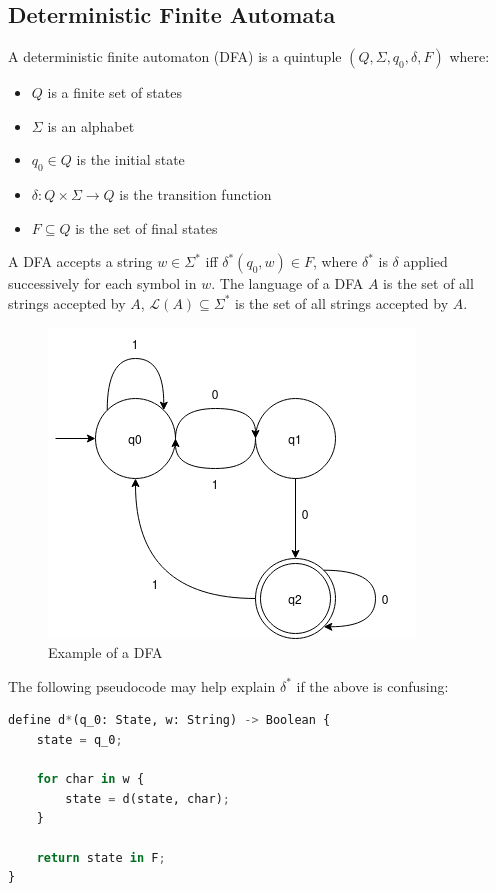 \documentclass{article}
\begin{document}
\subsection{Deterministic Finite Automata}\label{dfa}
A deterministic finite automaton (DFA) is a quintuple $(Q, \Sigma, q_0, \delta, F)$ where:
\begin{itemize}
    \item $Q$ is a finite set of states
    \item $\Sigma$ is an alphabet
    \item $q_0 \in Q$ is the initial state
    \item $\delta : Q \times \Sigma \to Q$ is the transition function
    \item $F \subseteq Q$ is the set of final states
\end{itemize}

A DFA accepts a string $w \in \Sigma^*$ iff $\delta^*(q_0, w) \in F$, where $\delta^*$ is $\delta$ applied successively for each symbol in $w$. The language of a DFA $A$ is the set of all strings accepted by $A$, $\mathcal{L}(A) \subseteq \Sigma^*$ is the set of all strings accepted by $A$.

\begin{figure}[H]
    \centering
    \includegraphics[scale=0.5]{images/dfa.png}
    \caption{Example of a DFA}
    \label{fig:dfa}
\end{figure}

The following pseudocode may help explain $\delta^*$ if the above is confusing:
\begin{lstlisting}[language=Python]
define d*(q_0: State, w: String) -> Boolean {
    state = q_0;
    
    for char in w {
        state = d(state, char);
    }
    
    return state in F;
}
\end{lstlisting}
\end{document}
